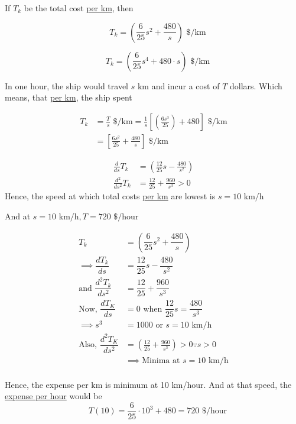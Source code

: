 \documentclass[14pt,fleqn]{extarticle}
\newcommand\dph{\text{ \$/hour}}
\newcommand\kmph{\text{ km/h}}
\newcommand\konst{\left( \frac{6s^3}{25} \right)}
\newcommand\dpk{\text{ \$/km}}
\begin{document}
\begin{question}
\begin{step}
\end{step}
\begin{step}
	\begin{options}
		\correct
		
		If $T_k$ be the total cost \underline{per km}, then 
		
      \[\quad T_k = \left(\dfrac{6}{25}s^2 + \dfrac{480}{s}\right)\dpk\]
      

		\incorrect

		
      \[\quad T_k = \left(\dfrac{6}{25}s^4 + 480\cdot s\right)\dpk\]
      

	\end{options}
	\reason
	
	In one hour, the ship would travel $s\text{ km}$ and incur a cost of $T$ dollars. Which means, that \underline{per km}, the ship spent 
	
	\begin{align}
	T_k &= \frac{T}{s}\dpk = \frac{1}{s} \left[\konst + 480 \right]\dpk  \\
	&= \left[\frac{6s^2}{25} + \frac{480}{s} \right]\dpk
\end{align}
	      
\end{step}
\begin{step}
	\begin{options}
		\correct
		
		\begin{align}
	\frac{d}{ds}T_k &= \left(\frac{12}{25}s - \frac{480}{s^2} \right) \\
	\frac{d^2}{ds^2}T_k &= \frac{12}{25} + \frac{960}{s^3} > 0
\end{align}
Hence, the speed at which total costs \underline{per km} are lowest is 
$s = 10 \kmph$ \newline 

And at $s = 10\kmph, T = 720 \dph$       

	\end{options}
	\reason

	
      \begin{align}
        T_k &= \left(\dfrac{6}{25}s^2 + \dfrac{480}{s}\right) \\
        \implies\dfrac{d T_k}{ds} &= \dfrac{12}{25}s - \dfrac{480}{s^2} \\
        \text{and }\dfrac{d^2 T_k}{ds^2} &= \dfrac{12}{25} + \dfrac{960}{s^3} \\
        \text{Now, } \dfrac{dT_K}{ds} &= 0 \text{ when }\dfrac{12}{25}s = \dfrac{480}{s^3} \\
        \implies s^3 &= 1000 \text{ or }  s = 10 \kmph\\
        \text{Also, }\dfrac{d^2 T_K}{ds^2} &= \left(\frac{12}{25} + \frac{960}{s^3} \right) > 0 \because s > 0 \\
        &\implies\text{Minima  at } s = 10\kmph 
      \end{align} \\
      Hence, the expense per km is minimum at
      10 km/hour. And at that speed, the
      \underline{expense per hour} would be 
      \[\quad T(10) = \dfrac{6}{25}\cdot 10^3 + 480 = 720 \dph\]
      
\end{step}
\end{question}
\end{document}
